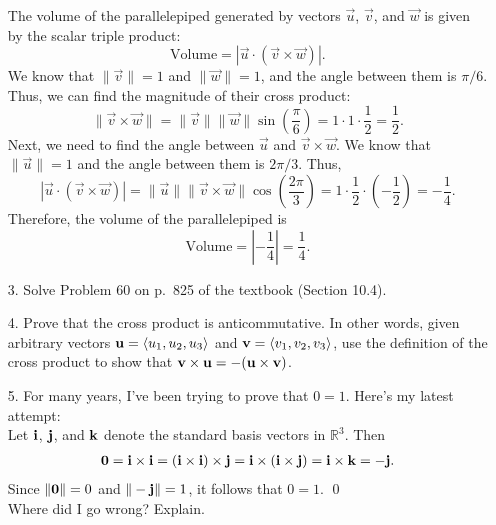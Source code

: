 \documentclass[reqno, 12pt]{amsart}
\newcommand{\R}{\mathbb R}
\begin{document}
\begin{itemize}
          The volume of the parallelepiped generated by vectors $\vec{u}$, $\vec{v}$, and $\vec{w}$ is given by the scalar triple product:
          \[
              \text{Volume} = |\vec{u} \cdot (\vec{v} \times \vec{w})|.
          \]
            We know that $\|\vec{v}\| = 1$ and $\|\vec{w}\| = 1$, and the angle between them is $\pi/6$. Thus, we can find the magnitude of their cross product:
          \[
              \|\vec{v} \times \vec{w}\| = \|\vec{v}\| \|\vec{w}\| \sin\left(\frac{\pi}{6}\right) = 1 \cdot 1 \cdot \frac{1}{2} = \frac{1}{2}.
          \]
            Next, we need to find the angle between $\vec{u}$ and $\vec{v} \times \vec{w}$. We know that $\|\vec{u}\| = 1$ and the angle between them is $2\pi/3$. Thus,
          \[
              |\vec{u} \cdot (\vec{v} \times \vec{w})| = \|\vec{u}\| \|\vec{v} \times \vec{w}\| \cos\left(\frac{2\pi}{3}\right) = 1 \cdot \frac{1}{2} \cdot \left(-\frac{1}{2}\right) = -\frac{1}{4}.
          \]
            Therefore, the volume of the parallelepiped is
          \[
              \text{Volume} = \left| -\frac{1}{4} \right| = \frac{1}{4}.
          \]

          \newpage
    \item[3.] Solve Problem 60 on p.~825 of the textbook (Section 10.4).

          \vspace{4 in}
    \item[4.] Prove that the cross product is anticommutative. In other words, given arbitrary vectors ${\bf u} = \langle u_1,u_2,u_3\rangle$ and ${\bf v} = \langle v_1,v_2,v_3\rangle$, use the definition of the cross product to show that ${\bf v} \times {\bf u} = -({\bf u} \times {\bf v})$.

          \newpage
    \item[5.] For many years, I've been trying to prove that $0 = 1$. Here's my latest attempt:\\

          Let ${\bf i}$, ${\bf j}$, and ${\bf k}$ denote the standard basis vectors in $\R^3$. Then
          \begin{align*}
              {\bf 0} = {\bf i} \times {\bf i} = ({\bf i} \times {\bf i}) \times {\bf j} = {\bf i} \times ({\bf i} \times {\bf j}) = {\bf i} \times {\bf k} = -{\bf j}.
          \end{align*}
          Since $\|{\bf 0}\| = 0$ and $\|-{\bf j}\| = 1$, it follows that $0 = 1$. \qed\\

          Where did I go wrong? Explain.


\end{itemize}
\end{document}
